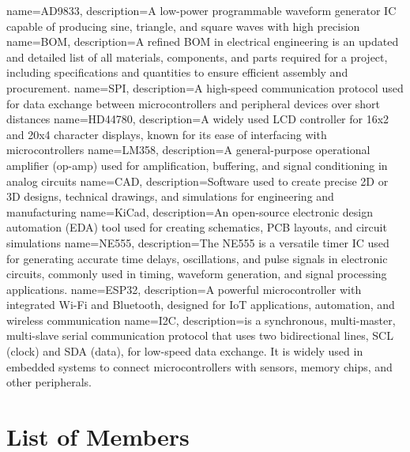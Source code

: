 \documentclass[12pt,a4paper]{article}
\begin{document}
{
    name=AD9833,
    description={A low-power programmable waveform generator IC capable of producing sine, triangle, and square waves with high precision}
}
{
    name=BOM,
    description={A refined BOM in electrical engineering is an updated and detailed list of all materials, components, and parts required for a project, including specifications and quantities to ensure efficient assembly and procurement.}
}
{
    name=SPI,
    description={A high-speed communication protocol used for data exchange between microcontrollers and peripheral devices over short distances}
}
{
    name=HD44780,
    description={A widely used LCD controller for 16x2 and 20x4 character displays, known for its ease of interfacing with microcontrollers}
}
{
    name=LM358,
    description={A general-purpose operational amplifier (op-amp) used for amplification, buffering, and signal conditioning in analog circuits}
}
{
    name=CAD,
    description={Software used to create precise 2D or 3D designs, technical drawings, and simulations for engineering and manufacturing}
}
{
    name=KiCad,
    description={An open-source electronic design automation (EDA) tool used for creating schematics, PCB layouts, and circuit simulations}
}
{
    name=NE555,
    description={The NE555 is a versatile timer IC used for generating accurate time delays, oscillations, and pulse signals in electronic circuits, commonly used in timing, waveform generation, and signal processing applications.}
}
{
    name=ESP32,
    description={A powerful microcontroller with integrated Wi-Fi and Bluetooth, designed for IoT applications, automation, and wireless communication}
}
{
    name=I2C,
    description={is a synchronous, multi-master, multi-slave serial communication protocol that uses two bidirectional lines, SCL (clock) and SDA (data), for low-speed data exchange. It is widely used in embedded systems to connect microcontrollers with sensors, memory chips, and other peripherals.}
}
\printglossary
\clearpage
\vspace{-1.5em}
\section*{List of Members}
\end{document}
